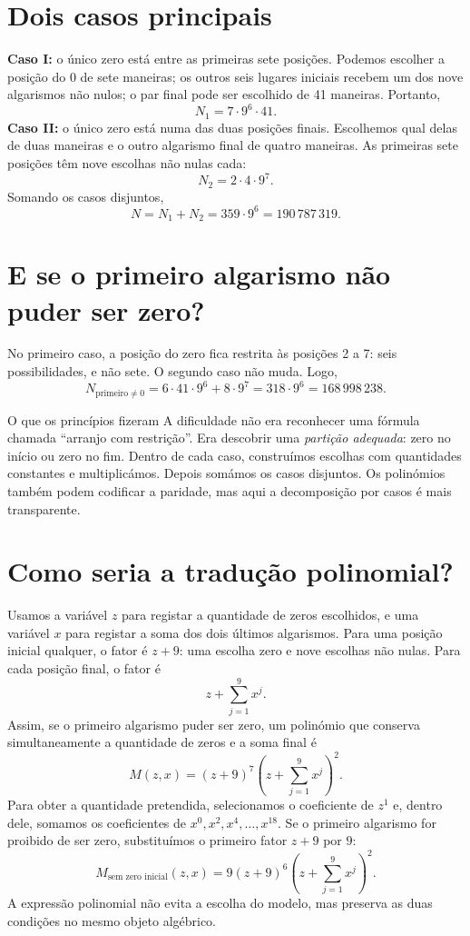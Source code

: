 \documentclass[11pt,a4paper,oneside]{book}
\begin{document}
\section{Dois casos principais}
\textbf{Caso I:} o único zero está entre as primeiras sete posições. Podemos escolher a posição do 0 de sete maneiras; os outros seis lugares iniciais recebem um dos nove algarismos não nulos; o par final pode ser escolhido de 41 maneiras. Portanto,
\[N_1=7\cdot9^6\cdot41.\]
\textbf{Caso II:} o único zero está numa das duas posições finais. Escolhemos qual delas de duas maneiras e o outro algarismo final de quatro maneiras. As primeiras sete posições têm nove escolhas não nulas cada:
\[N_2=2\cdot4\cdot9^7.\]
Somando os casos disjuntos,
\[
\boxed{N=N_1+N_2=359\cdot9^6=190\,787\,319}.\]
\section{E se o primeiro algarismo não puder ser zero?}
No primeiro caso, a posição do zero fica restrita às posições 2 a 7: seis possibilidades, e não sete. O segundo caso não muda. Logo,
\[
\boxed{N_{\text{primeiro}\ne0}=6\cdot41\cdot9^6+8\cdot9^7
=318\cdot9^6=168\,998\,238}.\]
\begin{observacaobox}{O que os princípios fizeram}
A dificuldade não era reconhecer uma fórmula chamada ``arranjo com restrição''. Era descobrir uma \emph{partição adequada}: zero no início ou zero no fim. Dentro de cada caso, construímos escolhas com quantidades constantes e multiplicámos. Depois somámos os casos disjuntos. Os polinómios também podem codificar a paridade, mas aqui a decomposição por casos é mais transparente.
\end{observacaobox}
\section{Como seria a tradução polinomial?}
Usamos a variável $z$ para registar a quantidade de zeros escolhidos, e uma variável $x$ para registar a soma dos dois últimos algarismos. Para uma posição inicial qualquer, o fator é $z+9$: uma escolha zero e nove escolhas não nulas. Para cada posição final, o fator é
\[z+\sum_{j=1}^{9}x^j.\]
Assim, se o primeiro algarismo puder ser zero, um polinómio que conserva simultaneamente a quantidade de zeros e a soma final é
\[
M(z,x)=(z+9)^7\left(z+\sum_{j=1}^{9}x^j\right)^2.
\]
Para obter a quantidade pretendida, selecionamos o coeficiente de $z^1$ e, dentro dele, somamos os coeficientes de $x^{0},x^{2},x^{4},\ldots,x^{18}$. Se o primeiro algarismo for proibido de ser zero, substituímos o primeiro fator $z+9$ por $9$:
\[M_{\text{sem zero inicial}}(z,x)=9(z+9)^6\left(z+\sum_{j=1}^{9}x^j\right)^2.\]
A expressão polinomial não evita a escolha do modelo, mas preserva as duas condições no mesmo objeto algébrico.
\end{document}
